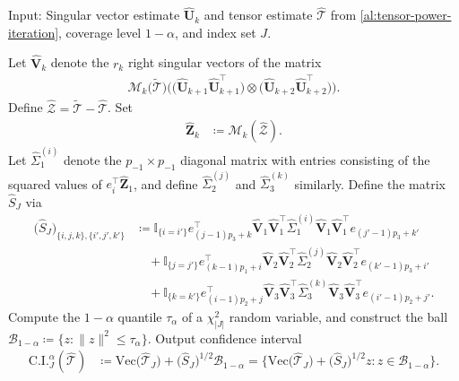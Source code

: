 \documentclass[10pt]{article}
\newcommand{\0}{{\mathbf{0}}}
\newcommand{\1}{{\mathbf{1}}}
\renewcommand{\t}{^{\top}}
\newcommand{\uhat}{\mathbf{\hat{U}}}
\renewcommand{\tilde}{\widetilde}
\renewcommand{\hat}{\widehat}
\renewcommand{\hat}{\widehat}
\begin{document}
  \begin{algorithm}[t]
	\caption{Simultaneous Confidence Intervals for $\mathcal{T}_{J}$}
	\begin{algorithmic}[1]
		\State Input:  Singular vector estimate $\uhat_k$ and tensor estimate $\mathcal{\hat T}$ from \cref{al:tensor-power-iteration}, coverage level $1 - \alpha$, and index set $J$.
		
			\State Let $\mathbf{\hat V}_k$ denote the $r_k$ right singular vectors of the matrix
		\begin{align*}
		    \mathcal{M}_k\big(  \mathcal{\tilde T} \big) \bigg( \big(\uhat_{k+1} \uhat_{k+1}\t \big) \otimes \big(\uhat_{k+2} \uhat_{k+2}\t \big) \bigg).
		\end{align*}
	\State Define $\mathcal{\hat Z} = \mathcal{\tilde T} - \mathcal{\hat T}$. Set
		\begin{align*}
		   \mathbf{\hat Z}_k &\coloneqq \mathcal{M}_k( \mathcal{\hat Z}).
		\end{align*}
		\State Let $\hat \Sigma^{(i)}_1$ denote the $p_{-1} \times p_{-1}$ diagonal matrix with entries consisting of the squared values of $e_i\t \mathbf{\hat Z}_1$, and define $\hat \Sigma_2^{(j)}$ and $\hat \Sigma_3^{(k)}$ similarly.  
		\State 
		Define the matrix $\hat S_J$ via
\begin{align*}
    \big(\hat S_{J} \big)_{\{i,j,k\},\{i',j',k'\}} &\coloneqq \mathbb{I}_{\{i= i'\}} e_{(j-1)p_3 + k}\t  \mathbf{\hat V}_1 \mathbf{\hat V}_1\t \hat \Sigma_1^{(i)} \mathbf{\hat V}_1 \mathbf{\hat V}_1\t e_{(j'-1)p_3 + k'} \\
    &\quad + \mathbb{I}_{\{j= j'\}} e_{(k-1)p_1 + i}\t  \mathbf{\hat V}_2 \mathbf{\hat V}_2\t\hat \Sigma_2^{(j)} \mathbf{\hat V}_2 \mathbf{\hat V}_2\t e_{(k'-1)p_3 + i'}  \\
    &\quad + \mathbb{I}_{\{k= k'\}} e_{(i-1)p_2 + j}\t  \mathbf{\hat V}_3 \mathbf{\hat V}_3\t \hat \Sigma_3^{(k)} \mathbf{\hat V}_3 \mathbf{\hat V}_3\t e_{(i'-1)p_2 +j'}.
\end{align*}
\State Compute the $1 - \alpha$ quantile $\tau_{\alpha}$ of a $\chi^2_{|J|}$ random variable, and construct the ball $\mathcal{B}_{1-\alpha} \coloneqq \{ z: \|z\|^2 \leq \tau_{\alpha} \}$.
\State Output confidence interval
\begin{align*}
    \mathrm{C.I.}^{\alpha}_{J}(\mathcal{\hat T}) &\coloneqq \mathrm{Vec}\big( \mathcal{\hat T}_J\big) + \big( \hat S_J\big)^{1/2} \mathcal{B}_{1-\alpha} = \{\mathrm{Vec}\big( \mathcal{\hat T}_J\big) + \big( \hat S_J\big)^{1/2} z: z \in \mathcal{B}_{1-\alpha}\}.
\end{align*}
		\end{algorithmic}\label{al:simultaneousci}
\end{algorithm}
\end{document}
